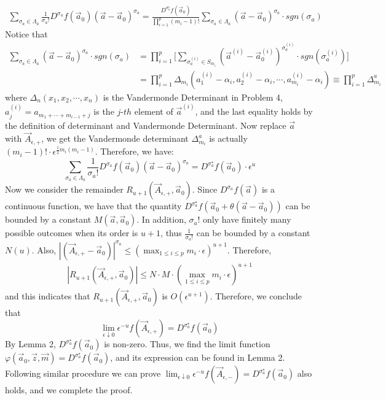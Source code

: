 \documentclass[12pt]{article}
\begin{document}
\begin{align*}
	\sum_{\sigma_{a}\in\Lambda_{a}}\frac{1}{\sigma_{a}!}D^{\sigma_{a}}f(\vec{a}_{0})(\vec{a}-\vec{a}_{0})^{\sigma_{a}}=\frac{D^{\sigma_{a}^{\star}}f(\vec{a}_{0})}{\prod_{i=1}^{p}(m_{i}-1)!}\sum_{\sigma_{a}\in\Lambda_{a}}(\vec{a}-\vec{a}_{0})^{\sigma_{a}}\cdot sgn(\sigma_{a})
\end{align*}
Notice that 
\begin{align*}
	\sum_{\sigma_{a}\in\Lambda_{a}}(\vec{a}-\vec{a}_{0})^{\sigma_{a}}\cdot sgn(\sigma_{a})&=\prod_{i=1}^{p}\Big[\sum_{\sigma_{a}^{(i)}\in S_{m_i}}(\vec{a}^{(i)}-\vec{a}_{0}^{(i)})^{\sigma_{a}^{(i)}}\cdot sgn(\sigma_{a}^{(i)})\Big]\\
	&=\prod_{i=1}^{p}\Delta_{m_i}(a_{1}^{(i)}-\alpha_{i},a_{2}^{(i)}-\alpha_{i},\cdots,a_{m_i}^{(i)}-\alpha_{i})\equiv\prod_{i=1}^{p}\Delta_{m_i}^{a}
\end{align*}
where $\Delta_{n}(x_{1},x_{2},\cdots,x_{n})$ is the Vandermonde Determinant in Problem 4, $a_{j}^{(i)}=a_{m_{1}+\cdots+m_{i-1}+j}$ is the $j$-$th$ element of $\vec{a}^{(i)}$, and the last equality holds by the definition of determinant and Vandermonde Determinant. Now replace $\vec{a}$ with $\vec{A}_{\epsilon,+}$, we get the Vandermonde determinant $\Delta_{m_{i}}^{a}$ is actually $(m_{i}-1)!\cdot\epsilon^{\frac{1}{2}m_{i}(m_{i}-1)}$. Therefore, we have: $$\sum_{\sigma_{a}\in\Lambda_{a}}\frac{1}{\sigma_{a}!}D^{\sigma_{a}}f(\vec{a}_{0})(\vec{a}-\vec{a}_{0})^{\sigma_{a}}=D^{\sigma_{a}^{\star}}f(\vec{a}_{0})\cdot\epsilon^{u}$$
Now we consider the remainder $R_{u+1}(\vec{A}_{\epsilon,+},\vec{a}_{0})$. Since $D^{\sigma_{a}}f(\vec{a})$ is a continuous function, we have that the quantity $D^{\sigma_{a}^{\star}}f(\vec{a}_{0}+\theta(\vec{a}-\vec{a}_{0}))$ can be bounded by a constant $M(\vec{a},\vec{a}_{0})$. In addition, $\sigma_{a}!$ only have finitely many possible outcomes when its order is $u+1$, thus $\frac{1}{\sigma_{a}!}$ can be bounded by a constant $N(u)$. Also, $|(\vec{A}_{\epsilon,+}-\vec{a}_{0})|^{\sigma_{a}}\leqslant (\max_{1\leqslant i\leqslant p}m_{i}\cdot \epsilon)^{u+1}$. Therefore,
\begin{align*}
	|R_{u+1}(\vec{A}_{\epsilon,+},\vec{a}_{0})|\leqslant N\cdot M \cdot (\max_{1\leqslant i\leqslant p}m_{i}\cdot \epsilon)^{u+1}
\end{align*}
and this indicates that $R_{u+1}(\vec{A}_{\epsilon,+},\vec{a}_{0})$ is $O(\epsilon^{u+1})$. Therefore, we conclude that 
$$\lim_{\epsilon\downarrow 0}\epsilon^{-u}f(\vec{A}_{\epsilon,+})=D^{\sigma_{a}^{\star}}f(\vec{a}_{0})$$
By Lemma 2, $D^{\sigma_{a}^{\star}}f(\vec{a}_{0})$ is non-zero. Thus, we find the limit function $\varphi(\vec{a}_{0},\vec{z},\vec{m})=D^{\sigma_{a}^{\star}}f(\vec{a}_{0})$, and its expression can be found in Lemma 2. Following similar procedure we can prove $\lim_{\epsilon\downarrow 0}\epsilon^{-u}f(\vec{A}_{\epsilon,-})=D^{\sigma_{a}^{\star}}f(\vec{a}_{0})$ also holds, and we complete the proof.\\
\end{document}
